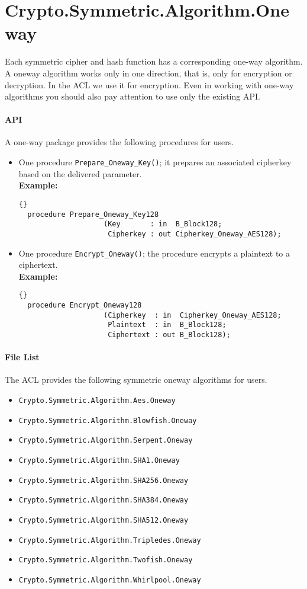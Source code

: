 \chapter{Crypto.Symmetric.Algorithm.Oneway}\label{OnewayAlgo}
Each symmetric cipher and hash function has a corresponding one-way algorithm. A oneway algorithm works only in one
direction, that is, only for encryption or decryption. In the ACL we use it for encryption. Even in working with one-way algorithms you should also pay attention to use only the existing API.
\subsubsection*{API}
A one-way package provides the following procedures for users.
\begin{itemize} 
\item One procedure \texttt{Prepare\_Oneway\_Key()}; it prepares an associated cipherkey based on the delivered parameter.\\
\textbf{Example:}
\begin{lstlisting}{}
  procedure Prepare_Oneway_Key128
            		(Key       : in  B_Block128;
             	 	 Cipherkey : out Cipherkey_Oneway_AES128);
\end{lstlisting}
\item One procedure \texttt{Encrypt\_Oneway()}; the procedure encrypts a plaintext to a ciphertext.\\
\textbf{Example:}
\begin{lstlisting}{}
  procedure Encrypt_Oneway128
            		(Cipherkey  : in  Cipherkey_Oneway_AES128;
            		 Plaintext  : in  B_Block128;
             		 Ciphertext : out B_Block128);
\end{lstlisting}
\end{itemize}
\subsubsection*{File List}
The ACL provides the following symmetric oneway algorithms for users.
\begin{itemize}
\item \texttt{Crypto.Symmetric.Algorithm.Aes.Oneway}
\item \texttt{Crypto.Symmetric.Algorithm.Blowfish.Oneway}
\item \texttt{Crypto.Symmetric.Algorithm.Serpent.Oneway}
\item \texttt{Crypto.Symmetric.Algorithm.SHA1.Oneway}
\item \texttt{Crypto.Symmetric.Algorithm.SHA256.Oneway}
\item \texttt{Crypto.Symmetric.Algorithm.SHA384.Oneway}
\item \texttt{Crypto.Symmetric.Algorithm.SHA512.Oneway}
\item \texttt{Crypto.Symmetric.Algorithm.Tripledes.Oneway}
\item \texttt{Crypto.Symmetric.Algorithm.Twofish.Oneway}
\item \texttt{Crypto.Symmetric.Algorithm.Whirlpool.Oneway}
\end{itemize}